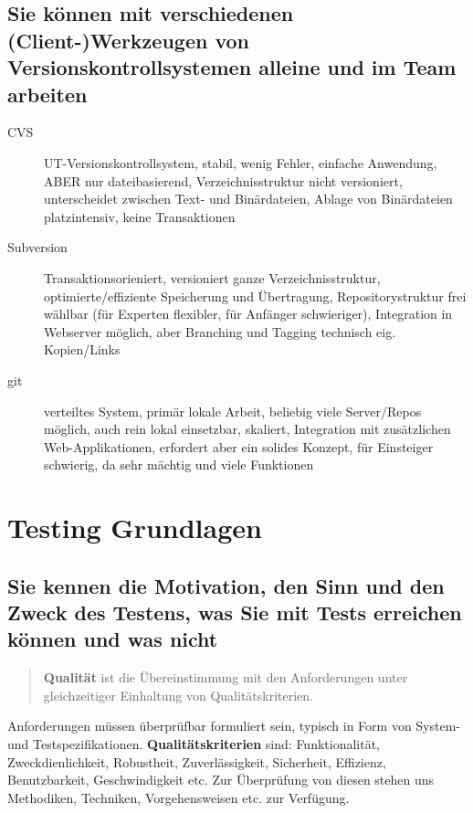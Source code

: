 \documentclass[a4paper]{article}
\begin{document}
		\subsection{Sie können mit verschiedenen (Client-)Werkzeugen von Versionskontrollsystemen alleine und im Team arbeiten}
		
		\begin{description}
			\item[CVS] UT-Versionskontrollsystem, stabil, wenig Fehler, einfache Anwendung, ABER nur dateibasierend, Verzeichnisstruktur nicht versioniert, unterscheidet zwischen Text- und Binärdateien, Ablage von Binärdateien platzintensiv, keine Transaktionen
			\item[Subversion] Transaktionsorieniert, versioniert ganze Verzeichnisstruktur, optimierte/effiziente Speicherung und Übertragung, Repositorystruktur frei wählbar (für Experten flexibler, für Anfänger schwieriger), Integration in Webserver möglich, aber Branching und Tagging technisch eig. Kopien/Links
			\item[git] verteiltes System, primär lokale Arbeit, beliebig viele Server/Repos möglich, auch rein lokal einsetzbar, skaliert, Integration mit zusätzlichen Web-Applikationen, erfordert aber ein solides Konzept, für Einsteiger schwierig, da sehr mächtig und viele Funktionen
		\end{description}
	
	\newpage
	\section{Testing Grundlagen}
		
		\subsection{Sie kennen die Motivation, den Sinn und den Zweck des Testens, was Sie mit Tests erreichen können und was nicht}
		
		\begin{quote}
			\textbf{Qualität} ist die Übereinstimmung mit den Anforderungen unter gleichzeitiger Einhaltung von Qualitätskriterien.
		\end{quote}
		\noindent
		Anforderungen müssen überprüfbar formuliert sein, typisch in Form von System- und Testspezifikationen.
		\textbf{Qualitätskriterien} sind: Funktionalität, Zweckdienlichkeit, Robustheit, Zuverlässigkeit, Sicherheit, Effizienz, Benutzbarkeit, Geschwindigkeit etc.
		Zur Überprüfung von diesen stehen uns Methodiken, Techniken, Vorgehensweisen etc. zur Verfügung.
		
\end{document}
